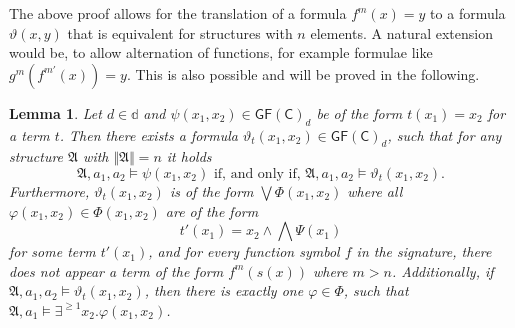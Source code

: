 \documentclass[a4paper,11pt,DIV=15]{scrartcl} %
\renewcommand{\phi}{\varphi}
\theoremstyle{plain}
\newtheorem{lemma}[theorem]{Lemma}
\theoremstyle{definition}
\newcommand{\GFC}{\mathsf{GF}(\mathsf{C})}
\renewcommand{\theta}{\vartheta}
\begin{document}
The above proof allows for the translation of a formula $f^m(x)=y$ to a formula $\theta(x,y)$ that is equivalent for structures with $n$ elements.
A natural extension would be, to allow alternation of functions, for example formulae like $g^m(f^{m'}(x))=y$.
This is also possible and will be proved in the following.

\begin{lemma}
	Let $d\in\mathbb d$ and $\psi(x_1,x_2)\in \GFC_d$ be of the form $t(x_1)=x_2$ for a term $t$.
	Then there exists a formula $\theta_{t}(x_1,x_2)\in\GFC_d$, such that for any structure $\mathfrak A$ with $\Vert \mathfrak A \Vert = n$ it holds
	$$\mathfrak A,a_1,a_2 \models \psi(x_1,x_2) \text{ if, and only if, } \mathfrak A,a_1,a_2 \models \vartheta_{t}(x_1,x_2).$$ 
	Furthermore, $\theta_{t}(x_1,x_2)$ is of the form $\bigvee \Phi(x_1,x_2)$ where all $\phi(x_1,x_2)\in\Phi(x_1,x_2)$ are of the form
	$$t'(x_1)=x_2 \land \bigwedge \Psi(x_1)$$ 
	for some term $t'(x_1)$, and for every function symbol $f$ in the signature, there does not appear a term of the form $f^m(s(x))$ where $m > n$.
	Additionally, if $\mathfrak A,a_1,a_2\models \theta_{t}(x_1,x_2)$, then there is exactly one $\phi\in\Phi$, such that $\mathfrak A,a_1\models \exists^{\geq 1}x_2.\phi(x_1,x_2)$.
	\label{TranslationOfArbTerms}
\end{lemma}
\end{document}
